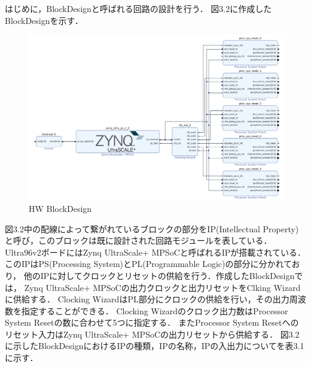 \documentclass[11pt,a4j]{jreport}
\begin{document}
はじめに，BlockDesignと呼ばれる回路の設計を行う．
図3.2に作成したBlockDesignを示す．
\begin{figure}[H]
  \center
  \includegraphics[scale = 0.4]{pict/pict2.jpg}
  \caption{HW BlockDesign}
\end{figure}
図3.2中の配線によって繋がれているブロックの部分をIP(Intellectual Property)
と呼び，このブロックは既に設計された回路モジュールを表している．
Ultra96v2ボードにはZynq UltraScale+ MPSoCと呼ばれるIPが搭載されている．
このIPはPS(Processing System)とPL(Programmable Logic)の部分に分かれており，
他のIPに対してクロックとリセットの供給を行う．作成したBlockDesignでは，
Zynq UltraScale+ MPSoCの出力クロックと出力リセットをClking Wizardに供給する．
Clocking WizardはPL部分にクロックの供給を行い，その出力周波数を指定することができる．
Clocking Wizardのクロック出力数はProcessor System Resetの数に合わせて5つに指定する．
またProcessor System Resetへのリセット入力はZynq UltraScale+ MPSoCの出力リセットから供給する．
図3.2に示したBlockDesignにおけるIPの種類，IPの名称，IPの入出力についてを表3.1に示す．
\end{document}
